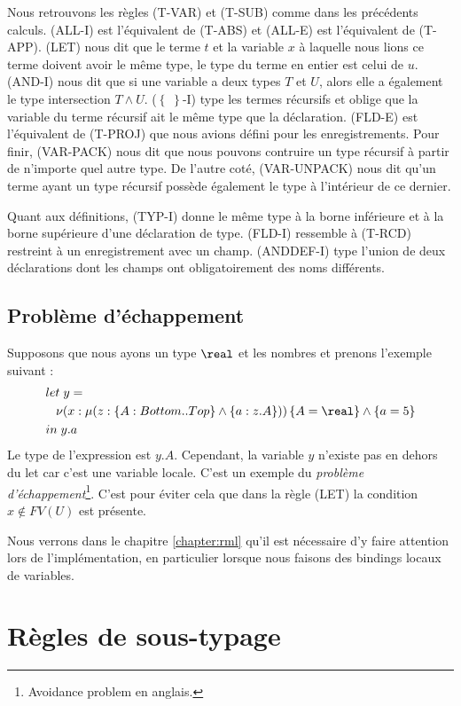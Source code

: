 Nous retrouvons les règles (T-VAR) et (T-SUB) comme dans les précédents calculs.
(ALL-I) est l'équivalent de (T-ABS) et (ALL-E) est l'équivalent de (T-APP).
(LET) nous dit que le terme $t$ et la variable $x$ à laquelle nous lions ce
terme doivent avoir le même type, le type du terme en entier est celui de $u$.
(AND-I) nous dit que si une variable a deux types $T$ et $U$, alors elle a
également le type intersection $T \wedge U$. ($\left\{ \; \right\}$-I) type les termes
récursifs et oblige que la variable du terme récursif ait le même type que la déclaration.
(FLD-E) est l'équivalent de (T-PROJ) que nous avions défini pour les
enregistrements.
Pour finir, (VAR-PACK) nous dit que nous pouvons
contruire un type récursif à partir de n'importe quel autre type. De l'autre
coté, (VAR-UNPACK) nous dit qu'un terme ayant un type récursif possède également
le type à l'intérieur de ce dernier.

Quant aux définitions, (TYP-I) donne le même type à la borne inférieure et à la
borne supérieure d'une déclaration de type. (FLD-I) ressemble à (T-RCD)
restreint à un enregistrement avec un champ. (ANDDEF-I) type l'union de deux
déclarations dont les champs ont obligatoirement des noms différents.

\subsection*{Problème d'échappement}

Supposons que nous ayons un type $\real$ et les nombres et prenons l'exemple suivant :
\begin{align*}
  & let \; y = \\
  &\; \; \; \nu(x : \mu(z : \left\{ A : Bottom .. Top \right\} \wedge \left\{ a : z.A \right\})) \left\{ A = \real \right\} \wedge \left\{ a = 5 \right\} \\
  & in \; y.a
\end{align*}
Le type de l'expression est $y.A$. Cependant, la variable $y$ n'existe pas en
dehors du let car c'est une variable locale. C'est un exemple du
\textit{problème d'échappement}\footnote{\og Avoidance problem \fg \; en
anglais.}. C'est pour éviter cela que dans la règle (LET) la condition $x \notin
FV(U)$ est présente.

Nous verrons dans le chapitre \ref{chapter:rml} qu'il est nécessaire d'y faire
attention lors de l'implémentation, en particulier lorsque nous faisons des
bindings locaux de variables.

\section{Règles de sous-typage}

